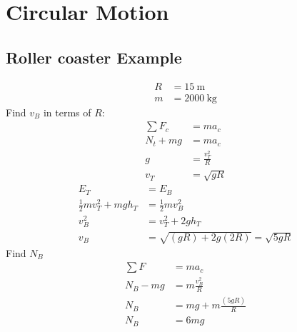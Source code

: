 \documentclass{article}
\begin{document}
\newcommand{\hr}{\par\noindent\rule{\textwidth}{0.4pt}}

\newcommand{\bc}[1]{
	\begin{equation*}
		\begin{boxed}
			{#1}
		\end{boxed}
	\end{equation*}
}

\newcommand{\cond}[2]{
	\ifmmode
		{#1} \quad {#2}
	\else
		$$ {#1} \quad {#2} $$
	\fi
}

\newcommand{\matr}[1]{\bm{#1}}
\newcommand{\vect}[1]{
	\ifmmode \mathbf{#1}
	\else \textbf{#1}
	\fi
}

\tableofcontents

\section{Circular Motion}

\subsection{Roller coaster Example}

\begin{align*}
	R & = \SI{15}{\meter} \\
	m & = \SI{2000}{\kilogram}
\end{align*}
Find $ v_B $ in terms of $ R $:
\begin{align*}
	\sum F_c & = ma_c \\
	N_t + mg & = ma_c \\
	g & = \frac{v_T^2}{R} \\
	v_T & = \sqrt{gR}
\end{align*}
\begin{align*}
	E_T & = E_B \\
	\frac{1}{2}mv_T^2 + mgh_T & = \frac{1}{2}mv_B^2 \\
	v_B^2 & = v_T^2 + 2gh_T \\
	v_B & = \sqrt{(gR) + 2g(2R)} = \sqrt{5gR}
\end{align*}
Find $ N_B $
\begin{align*}
	\sum F & = ma_c \\
	N_B - mg & = m\frac{v_B^2}{R} \\
	N_B & = mg + m \frac{(5gR)}{R} \\
	N_B & = 6mg
\end{align*}
\end{document}
